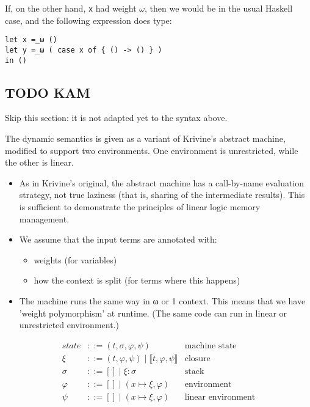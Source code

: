 \documentclass[11pt]{article}
\newcommand{\susp}[1]{⟦#1⟧}
\begin{document}
If, on the other hand, \verb|x| had weight $ω$, then we would be in the
usual Haskell case, and the following expression does type:
\begin{verbatim}
let x =_ω ()
let y =_ω ( case x of { () -> () } )
in ()
\end{verbatim}


\subsection{{\bfseries\sffamily TODO} KAM}
\label{sec:orgheadline14}

Skip this section: it is not adapted yet to the syntax above.

The dynamic semantics is given as a variant of Krivine's abstract
machine, modified to support two environments. One environment is
unrestricted, while the other is linear.

\begin{itemize}
\item As in Krivine's original, the abstract machine has a call-by-name
evaluation strategy, not true laziness (that is, sharing of the
intermediate results). This is sufficient to demonstrate the
principles of linear logic memory management.

\item We assume that the input terms are annotated with:
\begin{itemize}
\item weights (for variables)
\item how the context is split (for terms where this happens)
\end{itemize}

\item The machine runs the same way in ω or 1 context. This means that we
have 'weight polymorphism' at runtime. (The same code can run in
linear or unrestricted environment.)
\end{itemize}

\begin{align*}
state       &::= (t,σ,φ,ψ) & \text{machine state} \\
ξ     &::= (t,φ,ψ) \mid \susp{t,φ,ψ} & \text{closure} \\
σ       &::= [] \mid ξ:σ & \text{stack} \\
φ &::= [] \mid (x↦ξ,φ) & \text{environment} \\
ψ &::= [] \mid (x↦ξ,φ) & \text{linear environment}
\end{align*}
\end{document}
